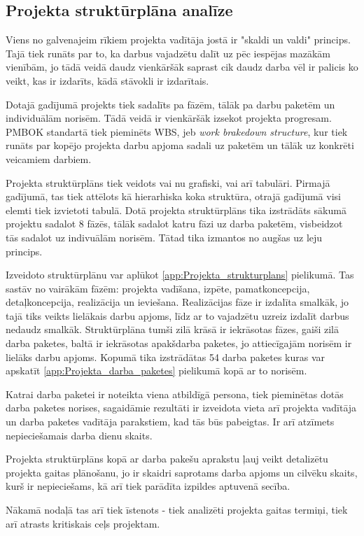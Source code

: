 \subsection{Projekta struktūrplāna analīze}
Viens no galvenajeim rīkiem projekta vadītāja jostā ir "skaldi un valdi" princips. Tajā tiek runāts par to,
ka darbus vajadzētu dalīt uz pēc iespējas mazākām vienībām, jo tādā veidā daudz vienkāršāk saprast cik daudz
darba vēl ir palicis ko veikt, kas ir izdarīts, kādā stāvokli ir izdarītais.
\par
Dotajā gadījumā projekts tiek sadalīts pa fāzēm, tālāk pa darbu paketēm un individuālām norisēm. Tādā veidā
ir vienkāršāk izsekot projekta progresam. PMBOK standartā tiek pieminēts WBS, jeb \textit{work brakedown structure},
kur tiek runāts par kopējo projekta darbu apjoma sadali uz paketēm un tālāk uz konkrēti veicamiem darbiem.
\par
Projekta struktūrplāns tiek veidots vai nu grafiski, vai arī tabulāri. Pirmajā gadījumā, tas tiek attēlots kā hierarhiska koka 
struktūra, otrajā gadījumā visi elemti tiek izvietoti tabulā. Dotā projekta struktūrplāns tika izstrādāts sākumā projektu
sadalot 8 fāzēs, tālāk sadalot katru fāzi uz darba paketēm, visbeidzot tās sadalot uz indivuālām norisēm. Tātad tika izmantos
no augšas uz leju princips.
\par
Izveidoto struktūrplānu var aplūkot \ref{app:Projekta_strukturplans} pielikumā. Tas sastāv no vairākām fāzēm:
projekta vadīšana, izpēte, pamatkoncepcija, detaļkoncepcija, realizācija un ieviešana. Realizācijas fāze ir izdalīta smalkāk,
jo tajā tiks veikts lielākais darbu apjoms, līdz ar to vajadzētu uzreiz izdalīt darbus nedaudz smalkāk. Struktūrplāna tumši
zilā krāsā ir iekrāsotas fāzes, gaiši zilā darba paketes, baltā ir iekrāsotas apakšdarba paketes, jo attiecīgajām norisēm
ir lielāks darbu apjoms. Kopumā tika izstrādātas 54 darba paketes kuras var apskatīt \ref{app:Projekta_darba_paketes} pielikumā kopā
ar to norisēm.
\par
Katrai darba paketei ir noteikta viena atbildīgā persona, tiek pieminētas dotās darba paketes norises, sagaidāmie rezultāti
ir izveidota vieta arī projekta vadītāja un darba paketes vadītāja parakstiem, kad tās būs pabeigtas. Ir arī atzīmets
nepieciešamais darba dienu skaits. 
\par
Projekta struktūrplāns kopā ar darba pakešu aprakstu ļauj veikt detalizētu projekta gaitas plānošanu, jo ir skaidri saprotams
darba apjoms un cilvēku skaits, kurš ir nepieciešams, kā arī tiek parādīta izpildes aptuvenā secība.
\par
Nākamā nodaļā tas arī tiek īstenots - tiek analizēti projekta gaitas termiņi, tiek arī atrasts kritiskais ceļs projektam.
